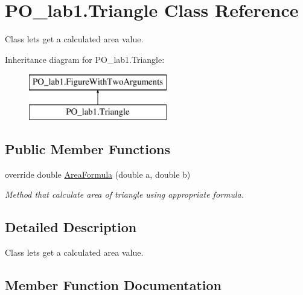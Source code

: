 \hypertarget{class_p_o__lab1_1_1_triangle}{}\section{P\+O\+\_\+lab1.\+Triangle Class Reference}
\label{class_p_o__lab1_1_1_triangle}


Class lets get a calculated area value.  


Inheritance diagram for P\+O\+\_\+lab1.\+Triangle\+:\begin{figure}[H]
\begin{center}
\leavevmode
\includegraphics[height=2.000000cm]{class_p_o__lab1_1_1_triangle}
\end{center}
\end{figure}
\subsection*{Public Member Functions}
\begin{DoxyCompactItemize}
\item 
override double \mbox{\hyperlink{class_p_o__lab1_1_1_triangle_aa4e000e20ad3f9b88b90b435c8b4d3ec}{Area\+Formula}} (double a, double b)
\begin{DoxyCompactList}\small\item\em Method that calculate area of triangle using appropriate formula. \end{DoxyCompactList}\end{DoxyCompactItemize}


\subsection{Detailed Description}
Class lets get a calculated area value. 



\subsection{Member Function Documentation}
\mbox{\label{class_p_o__lab1_1_1_triangle_aa4e000e20ad3f9b88b90b435c8b4d3ec}} 
